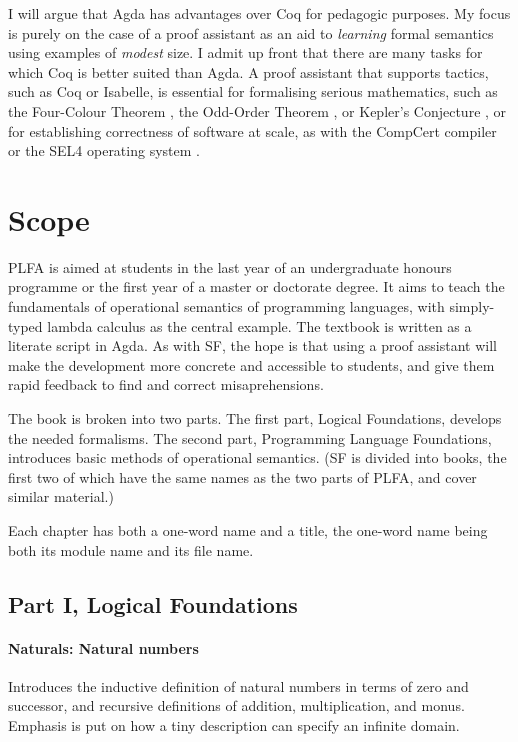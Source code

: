 \documentclass[runningheads]{llncs}
\begin{document}
I will argue that Agda has advantages over Coq for
pedagogic purposes.  My focus is purely on the case of a proof assistant
as an aid to \emph{learning} formal semantics using examples of
\emph{modest} size.  I admit up front that
there are many tasks for which Coq is better suited than Agda.
A proof assistant that supports tactics, such as Coq or Isabelle,
is essential for formalising serious mathematics,
such as the Four-Colour Theorem \citep{Gonthier-2008},
the Odd-Order Theorem \citep{Gonthier-et-al-2013},
or Kepler's Conjecture \citep{Hales-et-al-2017},
or for establishing correctness of software at scale,
as with the CompCert compiler \citep{Leroy-2009,Kastner-et-al-2017}
or the SEL4 operating system \citep{Klein-2009,O'Connor-2016}.

\section{Scope}

PLFA is aimed at students in the last year of an undergraduate
honours programme or the first year of a master or doctorate degree.
It aims to teach the fundamentals of operational semantics of
programming languages, with simply-typed lambda calculus as the
central example.  The textbook is written as a literate script in Agda.
As with SF, the hope is that using
a proof assistant will make the development more concrete
and accessible to students, and give them rapid feedback to find
and correct misaprehensions.

The book is broken into two parts. The first part, Logical Foundations,
develops the needed formalisms.  The second part, Programming Language
Foundations, introduces basic methods of operational semantics.
(SF is divided into books, the first two of which have the same names
as the two parts of PLFA, and cover similar material.)

Each chapter has both a one-word name and a title, the one-word name
being both its module name and its file name.

\subsection*{Part I, Logical Foundations}

\paragraph{Naturals: Natural numbers}
Introduces the inductive definition of natural numbers in terms of
zero and successor, and recursive definitions of addition,
multiplication, and monus. Emphasis is put on how a tiny description
can specify an infinite domain.
\end{document}

